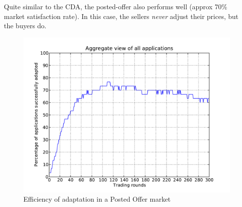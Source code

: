 \documentclass[10pt,journal,compsoc]{IEEEtran}
\begin{document}
Quite similar to the CDA, the posted-offer also performs well (approx 70\% market satisfaction rate). In this case, the sellers \textit{never} adjust their prices, but the buyers do. 

\begin{figure}[h]
	\centering
	\includegraphics[scale=0.45]{graphs/posted_offer_2_cand_3_qa.pdf}
	\caption{Efficiency of adaptation in a Posted Offer market \label{fig:posted_offer_market_satisfaction}}
\end{figure}
\end{document}
